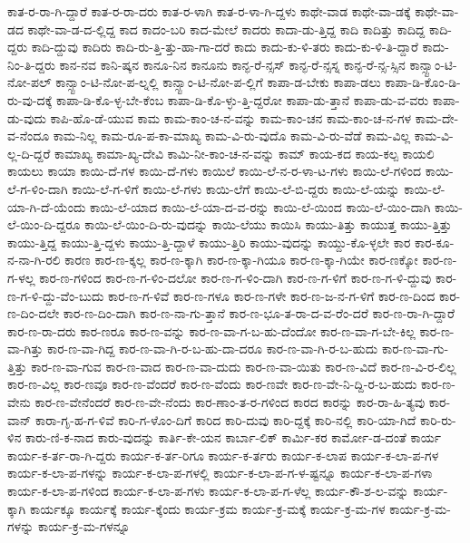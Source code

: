 {ಕಾತ-ರ-ರಾ-ಗಿ-ದ್ದಾರೆ
ಕಾತ-ರ-ರಾ-ದರು
ಕಾತ-ರ-ಳಾಗಿ
ಕಾತ-ರ-ಳಾ-ಗಿ-ದ್ದಳು
ಕಾಥೇ-ವಾಡ
ಕಾಥೇ-ವಾ-ಡಕ್ಕೆ
ಕಾಥೇ-ವಾ-ಡದ
ಕಾಥೇ-ವಾ-ಡ-ದ-ಲ್ಲಿದ್ದ
ಕಾದ
ಕಾದಂ-ಬರಿ
ಕಾದ-ಮೇಲೆ
ಕಾದರು
ಕಾದಾ-ಡು-ತ್ತಿದ್ದ
ಕಾದಿ
ಕಾದಿತ್ತು
ಕಾದಿದ್ದ
ಕಾದಿ-ದ್ದರು
ಕಾದಿ-ದ್ದುವು
ಕಾದಿರು
ಕಾದಿ-ರು-ತ್ತಿ-ತ್ತು-ಹಾ-ಗಾ-ದರೆ
ಕಾದು
ಕಾದು-ಕು-ಳಿ-ತರು
ಕಾದು-ಕು-ಳಿ-ತಿ-ದ್ದಾರೆ
ಕಾದು-ನಿಂ-ತಿ-ದ್ದರು
ಕಾನ-ನವ
ಕಾನಿ-ಷ್ಕನ
ಕಾನೂ-ನಿನ
ಕಾನೂನು
ಕಾನ್ಫ-ರೆ-ನ್ಸಸ್
ಕಾನ್ಫ-ರೆ-ನ್ಸಸ್ನ
ಕಾನ್ಫ-ರೆ-ನ್ಸ-ಸ್ಸಿನ
ಕಾನ್ಸ್ಟಾಂ-ಟಿ-ನೋ-ಪಲ್
ಕಾನ್ಸ್ಟಾಂ-ಟಿ-ನೋ-ಪ-ಲ್ನಲ್ಲಿ
ಕಾನ್ಸ್ಟಾಂ-ಟಿ-ನೋ-ಪ-ಲ್ಲಿಗೆ
ಕಾಪಾ-ಡ-ಬೇಕು
ಕಾಪಾ-ಡಲು
ಕಾಪಾ-ಡಿ-ಕೊಂ-ಡಿ-ರು-ವು-ದಕ್ಕೆ
ಕಾಪಾ-ಡಿ-ಕೊ-ಳ್ಳ-ಬೇ-ಕೆಂಬ
ಕಾಪಾ-ಡಿ-ಕೊ-ಳ್ಳು-ತ್ತಿ-ದ್ದರೋ
ಕಾಪಾ-ಡು-ತ್ತಾನೆ
ಕಾಪಾ-ಡು-ವ-ವರು
ಕಾಪಾ-ಡು-ವುದು
ಕಾಪಿ-ಹೊ-ಡೆ-ಯುವ
ಕಾಮ
ಕಾಮ-ಕಾಂ-ಚ-ನ-ವನ್ನು
ಕಾಮ-ಕಾಂ-ಚನ
ಕಾಮ-ಕಾಂ-ಚ-ನ-ಗಳ
ಕಾಮ-ದೇ-ವ-ನೆಂದೂ
ಕಾಮ-ನಿಲ್ಲ
ಕಾಮ-ರೂ-ಪ-ಕಾ-ಮಾಖ್ಯ
ಕಾಮ-ವಿ-ರು-ವುದೊ
ಕಾಮ-ವಿ-ರು-ವೆಡೆ
ಕಾಮ-ವಿಲ್ಲ
ಕಾಮ-ವಿ-ಲ್ಲ-ದಿ-ದ್ದರೆ
ಕಾಮಾಖ್ಯ
ಕಾಮಾ-ಖ್ಯ-ದೇವಿ
ಕಾಮಿ-ನೀ-ಕಾಂ-ಚ-ನ-ವನ್ನು
ಕಾಮ್
ಕಾಯ-ಕದ
ಕಾಯ-ಕಲ್ಪ
ಕಾಯಲಿ
ಕಾಯಲು
ಕಾಯಾ
ಕಾಯಿ-ದೆ-ಗಳ
ಕಾಯಿ-ದೆ-ಗಳು
ಕಾಯಿಲೆ
ಕಾಯಿ-ಲೆ-ನ-ರ-ಳಾ-ಟ-ಗಳು
ಕಾಯಿ-ಲೆ-ಗಳಿಂದ
ಕಾಯಿ-ಲೆ-ಗ-ಳಿಂ-ದಾಗಿ
ಕಾಯಿ-ಲೆ-ಗ-ಳಿಗೆ
ಕಾಯಿ-ಲೆ-ಗಳು
ಕಾಯಿ-ಲೆಗೆ
ಕಾಯಿ-ಲೆ-ಬಿ-ದ್ದರು
ಕಾಯಿ-ಲೆ-ಯನ್ನು
ಕಾಯಿ-ಲೆ-ಯಾ-ಗಿ-ದೆ-ಯೆಂದು
ಕಾಯಿ-ಲೆ-ಯಾದ
ಕಾಯಿ-ಲೆ-ಯಾ-ದ-ವ-ರನ್ನು
ಕಾಯಿ-ಲೆ-ಯಿಂದ
ಕಾಯಿ-ಲೆ-ಯಿಂ-ದಾಗಿ
ಕಾಯಿ-ಲೆ-ಯಿಂ-ದಿ-ದ್ದರೂ
ಕಾಯಿ-ಲೆ-ಯಿಂ-ದಿ-ರು-ವುದನ್ನು
ಕಾಯಿ-ಲೆಯು
ಕಾಯಿಸಿ
ಕಾಯು-ತಿತ್ತು
ಕಾಯುತ್ತ
ಕಾಯು-ತ್ತಿತ್ತು
ಕಾಯು-ತ್ತಿದ್ದ
ಕಾಯು-ತ್ತಿ-ದ್ದಳು
ಕಾಯು-ತ್ತಿ-ದ್ದಾಳೆ
ಕಾಯು-ತ್ತಿರಿ
ಕಾಯು-ವುದನ್ನು
ಕಾಯ್ದು-ಕೊ-ಳ್ಳಲೇ
ಕಾರ
ಕಾರ-ಕೂ-ನ-ನಾ-ಗಿ-ರಲಿ
ಕಾರಣ
ಕಾರ-ಣ-ಕ್ಕಲ್ಲ
ಕಾರ-ಣ-ಕ್ಕಾಗಿ
ಕಾರ-ಣ-ಕ್ಕಾ-ಗಿಯೂ
ಕಾರ-ಣ-ಕ್ಕಾ-ಗಿಯೇ
ಕಾರ-ಣಕ್ಕೋ
ಕಾರ-ಣ-ಗ-ಳಲ್ಲ
ಕಾರ-ಣ-ಗಳಿಂದ
ಕಾರ-ಣ-ಗ-ಳಿಂ-ದಲೋ
ಕಾರ-ಣ-ಗ-ಳಿಂ-ದಾಗಿ
ಕಾರ-ಣ-ಗ-ಳಿಗೆ
ಕಾರ-ಣ-ಗ-ಳಿ-ದ್ದುವು
ಕಾರ-ಣ-ಗ-ಳಿ-ದ್ದು-ವೆಂ-ಬುದು
ಕಾರ-ಣ-ಗ-ಳಿವೆ
ಕಾರ-ಣ-ಗಳೂ
ಕಾರ-ಣ-ಗಳೇ
ಕಾರ-ಣ-ಜ-ನ-ಗ-ಳಿಗೆ
ಕಾರ-ಣ-ದಿಂದ
ಕಾರ-ಣ-ದಿಂ-ದಲೇ
ಕಾರ-ಣ-ದಿಂ-ದಾಗಿ
ಕಾರ-ಣ-ನಾ-ಗು-ತ್ತಾನೆ
ಕಾರ-ಣ-ಭೂ-ತ-ರಾ-ದ-ವ-ರೆಂ-ದರೆ
ಕಾರ-ಣ-ರಾ-ಗಿ-ದ್ದಾರೆ
ಕಾರ-ಣ-ರಾ-ದರು
ಕಾರ-ಣರೂ
ಕಾರ-ಣ-ವನ್ನು
ಕಾರ-ಣ-ವಾ-ಗ-ಬ-ಹು-ದೆಂದೋ
ಕಾರ-ಣ-ವಾ-ಗ-ಬೇ-ಕಿಲ್ಲ
ಕಾರ-ಣ-ವಾ-ಗಿತ್ತು
ಕಾರ-ಣ-ವಾ-ಗಿದ್ದ
ಕಾರ-ಣ-ವಾ-ಗಿ-ರ-ಬ-ಹು-ದಾ-ದರೂ
ಕಾರ-ಣ-ವಾ-ಗಿ-ರ-ಬ-ಹುದು
ಕಾರ-ಣ-ವಾ-ಗು-ತ್ತಿತ್ತು
ಕಾರ-ಣ-ವಾ-ಗುವ
ಕಾರ-ಣ-ವಾದ
ಕಾರ-ಣ-ವಾ-ದುದು
ಕಾರ-ಣ-ವಾ-ಯಿತು
ಕಾರ-ಣ-ವಿದೆ
ಕಾರ-ಣ-ವಿ-ರ-ಲಿಲ್ಲ
ಕಾರ-ಣ-ವಿಲ್ಲ
ಕಾರ-ಣವೂ
ಕಾರ-ಣ-ವೆಂದರೆ
ಕಾರ-ಣ-ವೆಂದು
ಕಾರ-ಣವೇ
ಕಾರ-ಣ-ವೇ-ನಿ-ದ್ದಿ-ರ-ಬ-ಹುದು
ಕಾರ-ಣ-ವೇನು
ಕಾರ-ಣ-ವೇನೆಂದರೆ
ಕಾರ-ಣ-ವೇ-ನೆಂದು
ಕಾರ-ಣಾಂ-ತ-ರ-ಗಳಿಂದ
ಕಾರದ
ಕಾರನ್ನು
ಕಾರ-ರಾ-ಹಿ-ತ್ಯವು
ಕಾರ-ವಾನ್
ಕಾರಾ-ಗೃ-ಹ-ಗ-ಳಿವೆ
ಕಾರಿ-ಗ-ಳೊಂ-ದಿಗೆ
ಕಾರಿದ
ಕಾರಿ-ದುವು
ಕಾರಿ-ದ್ದಕ್ಕೆ
ಕಾರಿ-ನಲ್ಲಿ
ಕಾರಿ-ಯಾ-ಗಿದೆ
ಕಾರಿ-ರು-ಳಿನ
ಕಾರು-ಣಿ-ಕ-ನಾದ
ಕಾರು-ವುದನ್ನು
ಕಾರ್ತಿ-ಕೇ-ಯನ
ಕಾರ್ಬಾ-ಲಿಕ್
ಕಾರ್ಮಿ-ಕರ
ಕಾರ್ಮೋ-ಡ-ದಂತೆ
ಕಾರ್ಯ
ಕಾರ್ಯ-ಕ-ರ್ತ-ರಾ-ಗಿ-ದ್ದರು
ಕಾರ್ಯ-ಕ-ರ್ತ-ರಿಗೂ
ಕಾರ್ಯ-ಕ-ರ್ತರು
ಕಾರ್ಯ-ಕ-ಲಾಪ
ಕಾರ್ಯ-ಕ-ಲಾ-ಪ-ಗಳ
ಕಾರ್ಯ-ಕ-ಲಾ-ಪ-ಗಳನ್ನು
ಕಾರ್ಯ-ಕ-ಲಾ-ಪ-ಗಳಲ್ಲಿ
ಕಾರ್ಯ-ಕ-ಲಾ-ಪ-ಗ-ಳ-ಷ್ಟನ್ನೂ
ಕಾರ್ಯ-ಕ-ಲಾ-ಪ-ಗಳಾ
ಕಾರ್ಯ-ಕ-ಲಾ-ಪ-ಗಳಿಂದ
ಕಾರ್ಯ-ಕ-ಲಾ-ಪ-ಗಳು
ಕಾರ್ಯ-ಕ-ಲಾ-ಪ-ಗ-ಳೆಲ್ಲ
ಕಾರ್ಯ-ಕೌ-ಶ-ಲ-ವನ್ನು
ಕಾರ್ಯ-ಕ್ಕಾಗಿ
ಕಾರ್ಯಕ್ಕೂ
ಕಾರ್ಯಕ್ಕೆ
ಕಾರ್ಯ-ಕ್ಕೆಂದು
ಕಾರ್ಯ-ಕ್ರಮ
ಕಾರ್ಯ-ಕ್ರ-ಮಕ್ಕೆ
ಕಾರ್ಯ-ಕ್ರ-ಮ-ಗಳ
ಕಾರ್ಯ-ಕ್ರ-ಮ-ಗಳನ್ನು
ಕಾರ್ಯ-ಕ್ರ-ಮ-ಗಳನ್ನೂ
}
